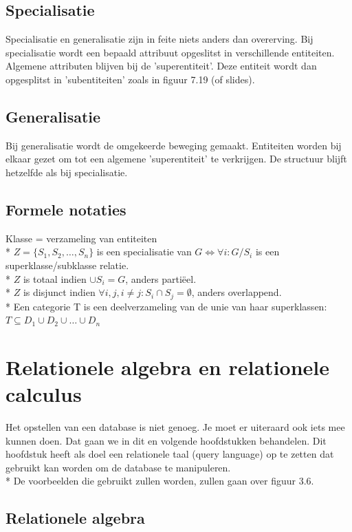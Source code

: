 \documentclass[10pt]{article}
\begin{document}
\subsection{Specialisatie}
Specialisatie en generalisatie zijn in feite niets anders dan overerving. Bij specialisatie wordt een bepaald attribuut opgeslitst in verschillende entiteiten. Algemene attributen blijven bij de 'superentiteit'. Deze entiteit wordt dan opgesplitst in 'subentiteiten' zoals in figuur 7.19 (of slides).
\subsection{Generalisatie}
Bij generalisatie wordt de omgekeerde beweging gemaakt. Entiteiten worden bij elkaar gezet om tot een algemene 'superentiteit' te verkrijgen. De structuur blijft hetzelfde als bij specialisatie.
\subsection{Formele notaties}
Klasse = verzameling van entiteiten\\*
$Z=\{S_1, S_2, \dots, S_n\}$ is een specialisatie van $G \Leftrightarrow \forall i: G/S_i$ is een superklasse/subklasse relatie.\\*
$Z$ is totaal indien $\cup S_i = G$, anders parti\"eel.\\*
$Z$ is disjunct indien $\forall i, j, i \ne j: S_i \cap S_j = \emptyset$, anders overlappend.\\*
Een categorie T is een deelverzameling van de unie van haar superklassen: $T \subseteq D_1 \cup D_2 \cup \dots \cup D_n$
\section{Relationele algebra en relationele calculus}
Het opstellen van een database is niet genoeg. Je moet er uiteraard ook iets mee kunnen doen. Dat gaan we in dit en volgende hoofdstukken behandelen. Dit hoofdstuk heeft als doel een relationele taal (query language) op te zetten dat gebruikt kan worden om de database te manipuleren.\\*
De voorbeelden die gebruikt zullen worden, zullen gaan over figuur 3.6.
\subsection{Relationele algebra}
\end{document}
